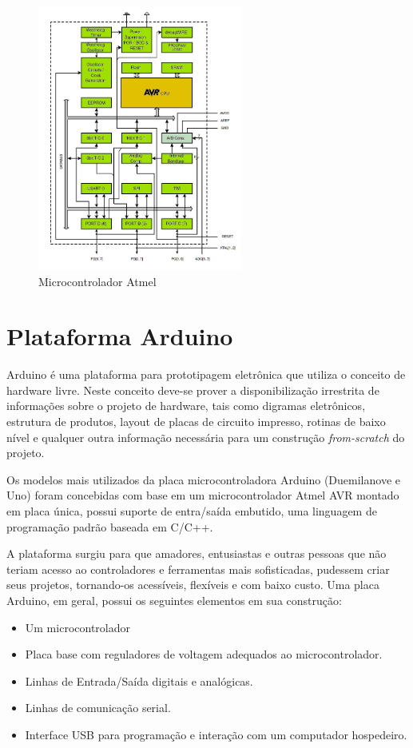 \begin{figure}[h!]
			\centering
			\includegraphics[width=0.6\textwidth]{figures/microcont_atm.jpg}
			\caption{Microcontrolador Atmel}
			\label{fig:atmegabloc}
	\end{figure}

\newpage
\section{Plataforma Arduino}

Arduino é uma plataforma para prototipagem eletrônica que utiliza o conceito de hardware livre. Neste conceito deve-se prover a disponibilização irrestrita de informações sobre o projeto de hardware, tais como digramas eletrônicos, estrutura de produtos, layout de placas de circuito impresso, rotinas de baixo nível e qualquer outra informação necessária para um construção \textit{from-scratch} do projeto.

Os modelos mais utilizados da placa microcontroladora Arduino (Duemilanove e Uno) foram concebidas com base em um microcontrolador Atmel AVR montado em placa única, possui suporte de entra/saída embutido, uma linguagem de programação padrão baseada em C/C++.

A plataforma surgiu para que amadores, entusiastas e outras pessoas que não teriam acesso ao controladores e ferramentas mais sofisticadas, pudessem criar seus projetos, tornando-os acessíveis, flexíveis e com baixo custo. Uma placa Arduino, em geral, possui os seguintes elementos em sua construção:

\begin{itemize}
	\item Um microcontrolador
	\item Placa base com reguladores de voltagem adequados ao microcontrolador.
	\item Linhas de Entrada/Saída digitais e analógicas.
	\item Linhas de comunicação serial.
	\item Interface USB para programação e interação com um computador hospedeiro.
\end{itemize} 


